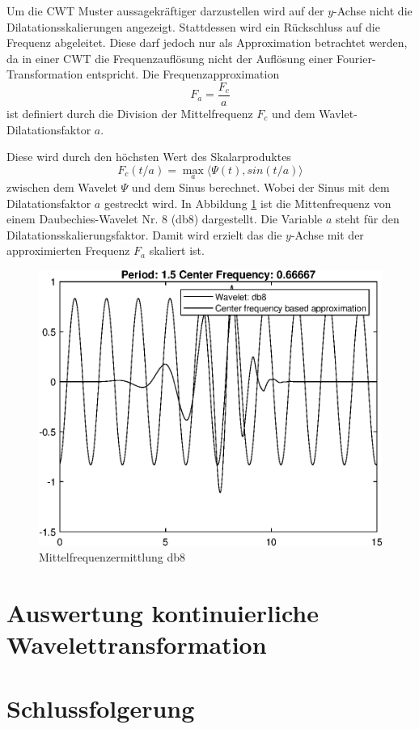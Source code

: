 \begin{refsection}
Um die CWT Muster aussagekräftiger darzustellen wird auf der $y$-Achse nicht die Dilatationsskalierungen angezeigt. Stattdessen wird ein Rückschluss auf die Frequenz abgeleitet. Diese darf jedoch nur als Approximation betrachtet werden, da in einer CWT die Frequenzauflösung nicht der Auflösung einer Fourier-Transformation entspricht. Die Frequenzapproximation 
\begin{equation}
F_a=\dfrac{F_c}{a}
\end{equation}
ist definiert durch die Division der Mittelfrequenz $F_c$ und dem Wavlet-Dilatationsfaktor $a$.

Diese wird durch den höchsten Wert des Skalarproduktes 
\begin{equation}
F_c(t/a) = \max_a\langle \Psi(t),sin(t/a)\rangle
\end{equation}
zwischen dem Wavelet $\Psi$ und dem Sinus berechnet.
Wobei der Sinus mit dem Dilatationsfaktor $a$ gestreckt wird.
In Abbildung \ref{fig:Mittenfrequ} ist die Mittenfrequenz von einem Daubechies-Wavelet Nr. 8 (db8) dargestellt.
Die Variable $a$ steht für den Dilatationsskalierungsfaktor. 
Damit wird erzielt das die $y$-Achse mit der approximierten Frequenz $F_a$ skaliert ist.

\begin{figure}
	\centering
	\includegraphics [width=0.7\linewidth] {papers/gis/Bilder/epsFig}
	\caption{Mittelfrequenzermittlung db8}
	\label{fig:Mittenfrequ}
\end{figure}


\section{Auswertung kontinuierliche Wavelettransformation}

\section{Schlussfolgerung}
 
\printbibliography[heading=subbibliography]
\end{refsection}
